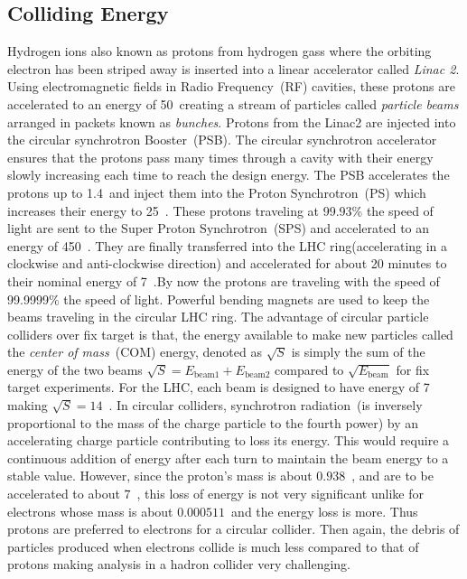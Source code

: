 \subsection{Colliding Energy}
Hydrogen ions also known as protons from hydrogen gass where the orbiting electron has been striped away is inserted into a linear 
accelerator called \textit{Linac 2}.
Using electromagnetic fields in Radio Frequency~(RF) cavities, these protons are accelerated to an energy of 50~\MeV creating a stream of particles called \textit{particle beams} arranged in packets known as \textit{bunches}.
Protons from the Linac2 are injected into the circular synchrotron Booster~(PSB).
The circular synchrotron accelerator ensures that the protons pass many times through a cavity with their energy slowly increasing each time to reach the design energy.
The PSB accelerates the protons up to 1.4~\GeV and inject them into the Proton Synchrotron~(PS) which increases their energy to 25~\GeV. These protons traveling at 99.93\% the speed of light are sent to the Super Proton Synchrotron~(SPS) and accelerated to an energy of 450~\GeV. They are finally transferred into the LHC ring(accelerating in a clockwise and anti-clockwise direction) and accelerated for about 20 minutes to their nominal energy of 7~\TeV.By now the protons are traveling with the speed of 99.9999\% the speed of light.
Powerful bending magnets are used to keep the beams traveling in the circular LHC ring. The advantage of circular particle colliders  over fix target is that, the energy available to make new particles called the \textit{center of mass}~(COM) energy, denoted as $\sqrt{S}$ is simply the sum of the energy of the two beams \ie $\sqrt{S} = \mathit{E}_{\mbox{beam1}} + \mathit{E}_{\mbox{beam2}}$ compared to $\sqrt{\mathit{E}_{\mbox{beam}}}$ for fix target experiments. For the LHC, each beam is designed to have energy of 7~\TeV 
making $\sqrt{S} = 14$~\TeV. In circular colliders, synchrotron radiation~(is inversely proportional to the mass of the charge particle to the fourth power) by an accelerating charge particle contributing to loss its energy. This would require a continuous addition of energy after each turn to maintain the beam energy to a stable value. However, since the proton's mass is  about $0.938$~\GeV, and are to be accelerated to about $7$~\TeV, this loss of energy is not very significant unlike for electrons whose mass is about $0.000511$~\GeV and the energy loss is  more. Thus protons are preferred to electrons for a circular collider.
Then again, the debris of particles produced when electrons collide is much less compared to that of protons making analysis in a hadron collider very challenging. 
